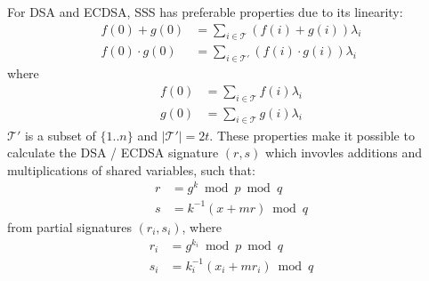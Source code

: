 For DSA and ECDSA, SSS has preferable properties due to its linearity:
\begin{align*}
f(0) + g(0) &= \sum_{i \in \mathcal{T}} (f(i) + g(i)) \lambda_i \\
f(0) \cdot g(0) &= \sum_{i \in \mathcal{T'}} (f(i) \cdot g(i)) \lambda_i
\end{align*}
where
\begin{align*}
  f(0) &= \sum_{i \in \mathcal{T}} f(i) \lambda_i \\
  g(0) &= \sum_{i \in \mathcal{T}} g(i) \lambda_i
\end{align*}
$\mathcal{T'}$ is a subset of $\{1..n\}$ and $|\mathcal{T'}| =
2t$. These properties make it possible to calculate the DSA / ECDSA
signature $(r, s)$ which invovles additions and multiplications of
shared variables, such that:
\begin{align*}
  r &= g^k \bmod p \bmod q\\
  s &= k^{-1}(x + mr) \bmod q
\end{align*}
from partial signatures $(r_i, s_i)$, where
\begin{align*}
  r_i &= g^{k_i} \bmod p \bmod q\\
  s_i &= k_i^{-1}(x_i + mr_i) \bmod q
\end{align*}
